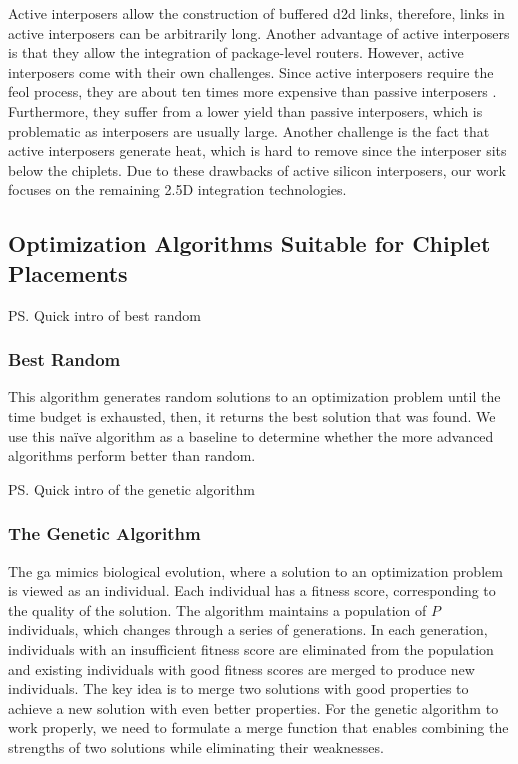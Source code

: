 Active interposers \cite{intact, first-act-int} allow the construction of buffered \gls{d2d} links, therefore, links in active interposers can be arbitrarily long.
Another advantage of active interposers is that they allow the integration of package-level routers.
However, active interposers come with their own challenges.
Since active interposers require the \gls{feol} process, they are about ten times more expensive than passive interposers \cite{coskun-2}.
Furthermore, they suffer from a lower yield than passive interposers, which is problematic as interposers are usually large.
Another challenge is the fact that active interposers generate heat, which is hard to remove since the interposer sits below the chiplets.
Due to these drawbacks of active silicon interposers, our work focuses on the remaining 2.5D integration technologies.


\subsection{Optimization Algorithms Suitable for Chiplet Placements}
\label{ssec:back-opt}

\ps{Quick intro of best random}

\subsubsection{Best Random}
\label{sssec:back-opt-br}

This algorithm generates random solutions to an optimization problem until the time budget is exhausted, then, it returns the best solution that was found.
We use this na\"ive algorithm as a baseline to determine whether the more advanced algorithms perform better than random.

\ps{Quick intro of the genetic algorithm}

\subsubsection{The Genetic Algorithm}
\label{sssec:back-opt-ga}

The \gls{ga} mimics biological evolution, where a solution to an optimization problem is viewed as an individual.
Each individual has a fitness score, corresponding to the quality of the solution.
The algorithm maintains a population of $P$ individuals, which changes through a series of generations.
In each generation, individuals with an insufficient fitness score are eliminated from the population and existing individuals with good fitness scores are merged to produce new individuals.
The key idea is to merge two solutions with good properties to achieve a new solution with even better properties.
For the genetic algorithm to work properly, we need to formulate a merge function that enables combining the strengths of two solutions while eliminating their weaknesses.


